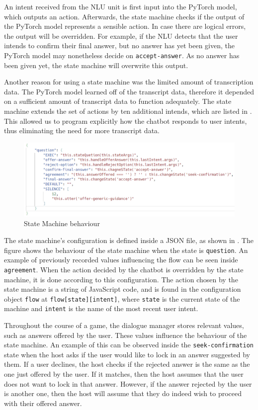 \documentclass[hidelinks, 11pt]{article}
\begin{document}
An intent received from the NLU unit is first input into the PyTorch model, which outputs an action. Afterwards, the state machine checks if the output of the PyTorch model represents a sensible action. In case there are logical errors, the output will be overridden. For example, if the NLU detects that the user intends to confirm their final answer, but no answer has yet been given, the PyTorch model may nonetheless decide on \verb|accept-answer|. As no answer has been given yet, the state machine will overwrite this output.

Another reason for using a state machine was the limited amount of transcription data. The PyTorch model learned off of the transcript data, therefore it depended on a sufficient amount of transcript data to function adequately. The state machine extends the set of actions by ten additional intends, which are listed in . This allowed us to program explicitly how the chatbot responds to user intents, thus eliminating the need for more transcript data.

\begin{figure}[h!]
  \includegraphics[width=\columnwidth]{images/jacks_figure.png}
  \caption{State Machine behaviour}
  \label{fig:jacks_figure}
\end{figure}

The state machine's configuration is defined inside a JSON file, as shown in . The figure shows the behaviour of the state machine when the state is \verb|question|. An example of previously recorded values influencing the flow can be seen inside \verb|agreement|. When the action decided by the chatbot is overridden by the state machine, it is done according to this configuration. The action chosen by the state machine is a string of JavaScript code, and is found in the configuration object \verb|flow| at \verb|flow[state][intent]|, where \verb|state| is the current state of the machine and \verb|intent| is the name of the most recent user intent.

Throughout the course of a game, the dialogue manager stores relevant values, such as answers offered by the user. These values influence the behaviour of the state machine. An example of this can be observed inside the \verb|seek-confirmation| state when the host asks if the user would like to lock in an answer suggested by them. If a user declines, the host checks if the rejected answer is the same as the one just offered by the user. If it matches, then the host assumes that the user does not want to lock in that answer. However, if the answer rejected by the user is another one, then the host will assume that they do indeed wish to proceed with their offered answer.
\end{document}
